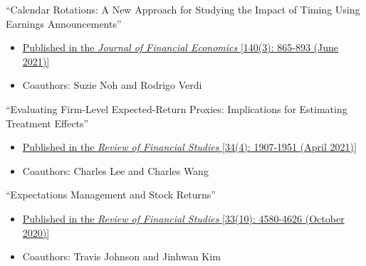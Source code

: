 \vskip 0.08cm
 \pagebreak[0]
\begin{samepage}
\item ``Calendar Rotations: A New Approach for Studying the Impact of Timing Using Earnings Announcements''
\begin{itemize}
\vspace*{-.07in}
	\item \href{https://doi.org/10.1016/j.jfineco.2021.01.009}{Published in the {\it Journal of Financial Economics} [140(3): 865-893 (June 2021)]}
	\vspace*{-.07in}
	\item Coauthors: Suzie Noh and Rodrigo Verdi
\end{itemize}
\end{samepage}


\vskip 0.08cm
\pagebreak[0]
\begin{samepage}
\item ``Evaluating Firm-Level Expected-Return Proxies: Implications for Estimating Treatment Effects''
\begin{itemize}
\vspace*{-.07in}
	\item \href{https://doi.org/10.1093/rfs/hhaa066}{Published in the {\it Review of Financial Studies} [34(4): 1907-1951 (April 2021)]}
\vspace*{-.07in}
	\item Coauthors: Charles Lee and Charles Wang 
\end{itemize}
\end{samepage}

\vskip 0.08cm
\pagebreak[0]
\begin{samepage}
\item ``Expectations Management and Stock Returns''
\begin{itemize}
\vspace*{-.07in}
	\item \href{https://doi.org/10.1093/rfs/hhz141}{Published in the {\it Review of Financial Studies} [33(10): 4580-4626 (October 2020)]}
	\vspace*{-.07in}
	\item Coauthors: Travis Johnson and Jinhwan Kim
\end{itemize}
\end{samepage}


